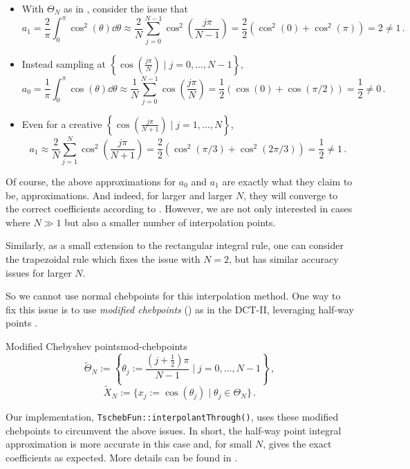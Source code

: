 \documentclass[12pt, a4paper]{article}
\newcommand{\tschebfun}{\textcolor{themecolor3}{TschebFun}\xspace}
\begin{document}
  \begin{itemize}
    \item With $\Theta_N$ as in , consider the issue that
          $$a_1 = \frac{2}{\pi} \int_{0}^{\pi} \cos^2(\theta) \dd\theta \approx \frac{2}{N} \sum_{j=0}^{N-1} \cos^2\left(\frac{j \pi}{N-1}\right) = \frac{2}{2} \left(\cos^2(0) + \cos^2(\pi)\right) = 2 \neq 1 \,.$$
    \item Instead sampling at $\left\{\cos\left(\frac{j\pi}{N}\right) \;\big|\; j = 0, ..., N-1\right\}$,
          $$a_0 = \frac{1}{\pi} \int_0^\pi \cos(\theta) \dd\theta \approx \frac{1}{N} \sum_{j=0}^{N-1} \cos(\frac{j\pi}{N}) = \frac{1}{2} \left(\cos(0) + \cos(\pi/2)\right) = \frac{1}{2} \neq 0 \,.$$
    \item Even for a creative $\left\{\cos\left(\frac{j\pi}{N+1}\right) \;\big|\; j = 1, ..., N\right\}$,
          $$a_1 \approx \frac{2}{N} \sum_{j=1}^{N} \cos^2\left(\frac{j \pi}{N+1}\right) = \frac{2}{2} \left(\cos^2(\pi/3) + \cos^2(2\pi/3)\right) = \frac{1}{2} \neq 1 \,.$$
  \end{itemize}

  Of course, the above approximations for $a_0$ and $a_1$ are exactly what they claim to be, approximations.
  And indeed, for larger and larger $N$, they will converge to the correct coefficients according to .
  However, we are not only interested in cases where $N \gg 1$ but also a smaller number of interpolation points.

  Similarly, as a small extension to the rectangular integral rule, one can consider the trapezoidal rule which fixes the issue with $N = 2$, but has similar accuracy issues for larger $N$.

  So we cannot use normal chebpoints for this interpolation method.
  One way to fix this issue is to use \emph{modified chebpoints} () as in the DCT-II, leveraging half-way points \parencite{CombTrig}.

  \begin{definition}{Modified Chebyshev points}{mod-chebpoints}
    $$\tilde{\Theta}_N := \left\{\theta_j := \frac{(j + \frac{1}{2})\pi}{N-1} \;\bigg|\; j = 0, ..., N-1\right\} \,,$$
    $$\tilde{X}_N := \{x_j := \cos(\theta_j) \;|\; \theta_j \in \Theta_N\} \,.$$
  \end{definition}

  Our implementation, \texttt{\tschebfun::\textcolor{themecolor2}{interpolantThrough}()}, uses these modified chebpoints to circumvent the above issues.
  In short, the half-way point integral approximation is more accurate in this case and, for small $N$, gives the exact coefficients as expected.
  More details can be found in \cite{CombTrig}.
\end{document}
